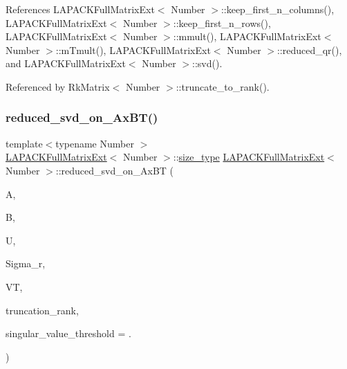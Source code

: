References L\+A\+P\+A\+C\+K\+Full\+Matrix\+Ext$<$ Number $>$\+::keep\+\_\+first\+\_\+n\+\_\+columns(), L\+A\+P\+A\+C\+K\+Full\+Matrix\+Ext$<$ Number $>$\+::keep\+\_\+first\+\_\+n\+\_\+rows(), L\+A\+P\+A\+C\+K\+Full\+Matrix\+Ext$<$ Number $>$\+::mmult(), L\+A\+P\+A\+C\+K\+Full\+Matrix\+Ext$<$ Number $>$\+::m\+Tmult(), L\+A\+P\+A\+C\+K\+Full\+Matrix\+Ext$<$ Number $>$\+::reduced\+\_\+qr(), and L\+A\+P\+A\+C\+K\+Full\+Matrix\+Ext$<$ Number $>$\+::svd().



Referenced by Rk\+Matrix$<$ Number $>$\+::truncate\+\_\+to\+\_\+rank().

\mbox{\label{classLAPACKFullMatrixExt_a56dbf804ab7f3ffb3ed3a09d5b4e5170}} 
\subsubsection{\texorpdfstring{reduced\+\_\+svd\+\_\+on\+\_\+\+Ax\+B\+T()}{reduced\_svd\_on\_AxBT()}\hspace{0.1cm}{\footnotesize\ttfamily [2/3]}}
{\footnotesize\ttfamily template$<$typename Number $>$ \\
\hyperlink{classLAPACKFullMatrixExt}{L\+A\+P\+A\+C\+K\+Full\+Matrix\+Ext}$<$ Number $>$\+::\hyperlink{classLAPACKFullMatrixExt_a5cf5f4a6104dc17029210b5ca52bf574}{size\+\_\+type} \hyperlink{classLAPACKFullMatrixExt}{L\+A\+P\+A\+C\+K\+Full\+Matrix\+Ext}$<$ Number $>$\+::reduced\+\_\+svd\+\_\+on\+\_\+\+Ax\+BT (\begin{DoxyParamCaption}\item[{\hyperlink{classLAPACKFullMatrixExt}{L\+A\+P\+A\+C\+K\+Full\+Matrix\+Ext}$<$ Number $>$ \&}]{A,  }\item[{\hyperlink{classLAPACKFullMatrixExt}{L\+A\+P\+A\+C\+K\+Full\+Matrix\+Ext}$<$ Number $>$ \&}]{B,  }\item[{\hyperlink{classLAPACKFullMatrixExt}{L\+A\+P\+A\+C\+K\+Full\+Matrix\+Ext}$<$ Number $>$ \&}]{U,  }\item[{std\+::vector$<$ typename numbers\+::\+Number\+Traits$<$ Number $>$\+::real\+\_\+type $>$ \&}]{Sigma\+\_\+r,  }\item[{\hyperlink{classLAPACKFullMatrixExt}{L\+A\+P\+A\+C\+K\+Full\+Matrix\+Ext}$<$ Number $>$ \&}]{VT,  }\item[{\hyperlink{classLAPACKFullMatrixExt_a5cf5f4a6104dc17029210b5ca52bf574}{size\+\_\+type}}]{truncation\+\_\+rank,  }\item[{Number}]{singular\+\_\+value\+\_\+threshold = {.} }\end{DoxyParamCaption})\hspace{0.3cm}{\ttfamily [static]}}

